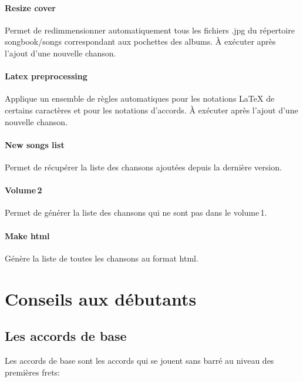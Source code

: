\documentclass[a4paper]{article}
\begin{document}
\paragraph{Resize cover}
Permet de redimmensionner automatiquement tous les fichiers .jpg du
répertoire songbook/songs correspondant aux pochettes des albums.
À exécuter après l'ajout d'une nouvelle chanson.

\paragraph{Latex preprocessing}
Applique un ensemble de règles automatiques pour les notations LaTeX
de certains caractères et pour les notations d'accords.
À exécuter après l'ajout d'une nouvelle chanson.

\paragraph{New songs list}
Permet de récupérer la liste des chansons ajoutées depuis la dernière
version.

\paragraph{Volume\,2}
Permet de générer la liste des chansons qui ne sont pas dans le volume\,1.

\paragraph{Make html}
Génère la liste de toutes les chansons au format html.


\section{Conseils aux débutants}

\subsection{Les accords de base}

Les accords de base sont les accords qui se jouent sans barré au
niveau des premières frets:
\end{document}
